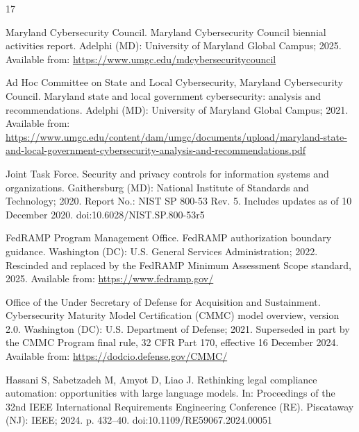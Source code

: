 %

\begin{thebibliography}{17}

Maryland Cybersecurity Council. Maryland Cybersecurity Council biennial
activities report. Adelphi (MD): University of Maryland Global Campus; 2025.
Available from: \url{https://www.umgc.edu/mdcybersecuritycouncil}

Ad Hoc Committee on State and Local Cybersecurity, Maryland Cybersecurity
Council. Maryland state and local government cybersecurity: analysis and
recommendations. Adelphi (MD): University of Maryland Global Campus; 2021.
Available from:
\url{https://www.umgc.edu/content/dam/umgc/documents/upload/maryland-state-and-local-government-cybersecurity-analysis-and-recommendations.pdf}

Joint Task Force. Security and privacy controls for information systems and
organizations. Gaithersburg (MD): National Institute of Standards and
Technology; 2020. Report No.: NIST SP 800-53 Rev. 5. Includes updates as of 10
December 2020. doi:10.6028/NIST.SP.800-53r5

FedRAMP Program Management Office. FedRAMP authorization boundary guidance.
Washington (DC): U.S. General Services Administration; 2022. Rescinded and
replaced by the FedRAMP Minimum Assessment Scope standard, 2025. Available from:
\url{https://www.fedramp.gov/}

Office of the Under Secretary of Defense for Acquisition and Sustainment.
Cybersecurity Maturity Model Certification (CMMC) model overview, version 2.0.
Washington (DC): U.S. Department of Defense; 2021. Superseded in part by the
CMMC Program final rule, 32 CFR Part 170, effective 16 December 2024. Available
from: \url{https://dodcio.defense.gov/CMMC/}

Hassani S, Sabetzadeh M, Amyot D, Liao J. Rethinking legal compliance
automation: opportunities with large language models. In: Proceedings of the
32nd IEEE International Requirements Engineering Conference (RE). Piscataway
(NJ): IEEE; 2024. p. 432--40. doi:10.1109/RE59067.2024.00051


\end{thebibliography}
